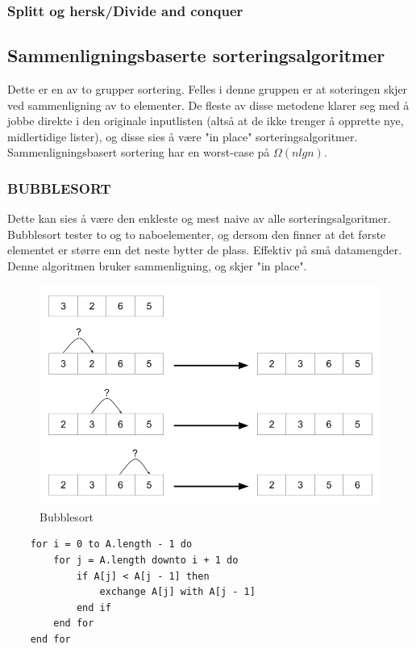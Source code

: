 \subsubsection{Splitt og hersk/Divide and conquer}

\subsection{Sammenligningsbaserte sorteringsalgoritmer}
Dette er en av to grupper sortering. Felles i denne gruppen er at soteringen skjer ved sammenligning av to elementer. De fleste av disse metodene klarer seg med å jobbe direkte i den originale inputlisten (altså at de ikke trenger å opprette nye, midlertidige lister), og disse sies å være "in place" sorteringsalgoritmer. Sammenligningsbasert sortering har en worst-case på $\Omega(n lg n)$.

\subsubsection{BUBBLESORT}
Dette kan sies å være den enkleste og mest naive av alle sorteringsalgoritmer. Bubblesort tester to og to naboelementer, og dersom den finner at det første elementet er større enn det neste bytter de plass. Effektiv på små datamengder. Denne algoritmen bruker sammenligning, og skjer "in place".

\begin{figure}[H]
\includegraphics[scale=0.5]{images/bubblesort}
\centering %
\caption{Bubblesort}
\label{fig:bubblesort}
\end{figure}

\begin{lstlisting}
    for i = 0 to A.length - 1 do
    	for j = A.length downto i + 1 do
		    if A[j] < A[j - 1] then
		    	exchange A[j] with A[j - 1]
		    end if
	    end for
    end for
\end{lstlisting}

